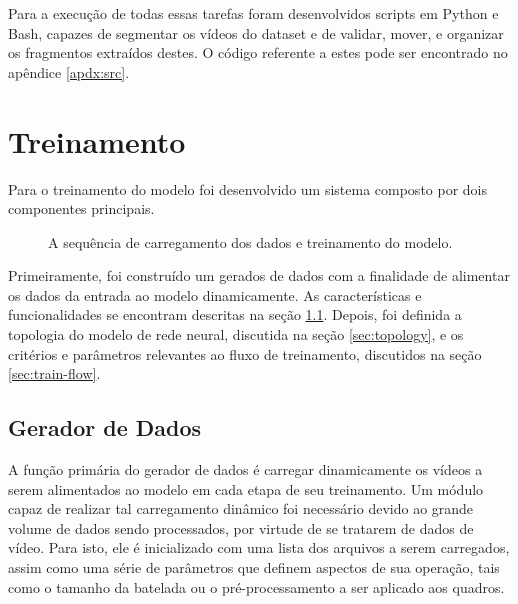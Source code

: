
Para a execução de todas essas tarefas foram desenvolvidos scripts em Python e Bash, capazes de segmentar os vídeos do dataset e de validar, mover, e organizar os fragmentos extraídos destes.
O código referente a estes pode ser encontrado no apêndice \ref{apdx:src}.

\section{Treinamento}
\label{sec:train}

Para o treinamento do modelo foi desenvolvido um sistema composto por dois componentes principais.

\begin{figure}[ht]
    \centering
    \fontsize{10pt}{10pt}\selectfont
    
    \caption{A sequência de carregamento dos dados e treinamento do modelo.}
    \label{fig:arch_train}
\end{figure}

Primeiramente, foi construído um gerados de dados com a finalidade de alimentar os dados da entrada ao modelo dinamicamente. As características e funcionalidades se encontram descritas na seção \ref{sec:data-gen}.
Depois, foi definida a topologia do modelo de rede neural, discutida na seção \ref{sec:topology}, e os critérios e parâmetros relevantes ao fluxo de treinamento, discutidos na seção \ref{sec:train-flow}.

\subsection{Gerador de Dados}
\label{sec:data-gen}
A função primária do gerador de dados é carregar dinamicamente os vídeos a serem alimentados ao modelo em cada etapa de seu treinamento.
Um módulo capaz de realizar tal carregamento dinâmico foi necessário devido ao grande volume de dados sendo processados, por virtude de se tratarem de dados de vídeo.
Para isto, ele é inicializado com uma lista dos arquivos a serem carregados, assim como uma série de parâmetros que definem aspectos de sua operação, tais como o tamanho da batelada ou o pré-processamento a ser aplicado aos quadros.

